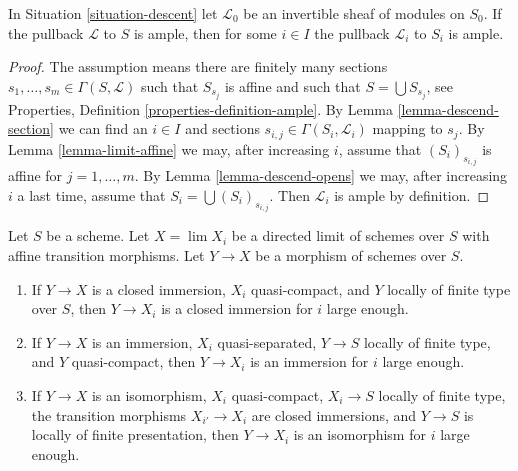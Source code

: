 \begin{lemma}
\label{lemma-limit-ample}
In Situation \ref{situation-descent} let $\mathcal{L}_0$ be an invertible
sheaf of modules on $S_0$. If the pullback $\mathcal{L}$ to $S$ is ample,
then for some $i \in I$ the pullback $\mathcal{L}_i$ to $S_i$ is ample.
\end{lemma}

\begin{proof}
The assumption means there are finitely many sections
$s_1, \ldots, s_m \in \Gamma(S, \mathcal{L})$ such that
$S_{s_j}$ is affine and such that $S = \bigcup S_{s_j}$, see
Properties, Definition \ref{properties-definition-ample}.
By Lemma \ref{lemma-descend-section} we can find an $i \in I$
and sections $s_{i, j} \in \Gamma(S_i, \mathcal{L}_i)$ mapping to $s_j$.
By Lemma \ref{lemma-limit-affine} we may, after increasing $i$, assume
that $(S_i)_{s_{i, j}}$ is affine for $j = 1, \ldots, m$.
By Lemma \ref{lemma-descend-opens} we may, after increasing $i$ a
last time, assume that $S_i = \bigcup (S_i)_{s_{i, j}}$.
Then $\mathcal{L}_i$ is ample by definition.
\end{proof}

\begin{lemma}
\label{lemma-finite-type-eventually-closed}
Let $S$ be a scheme. Let $X = \lim X_i$ be a directed limit of
schemes over $S$ with affine transition morphisms. Let $Y \to X$
be a morphism of schemes over $S$.
\begin{enumerate}
\item If $Y \to X$ is a closed immersion, $X_i$ quasi-compact, and
$Y$ locally of finite type over $S$, then $Y \to X_i$ is a closed
immersion for $i$ large enough.
\item If $Y \to X$ is an immersion, $X_i$ quasi-separated, $Y \to S$ locally
of finite type, and $Y$ quasi-compact, then $Y \to X_i$ is an
immersion for $i$ large enough.
\item If $Y \to X$ is an isomorphism, $X_i$ quasi-compact,
$X_i \to S$ locally of finite type, the transition morphisms
$X_{i'} \to X_i$ are closed immersions, and $Y \to S$ is locally
of finite presentation, then $Y \to X_i$ is an isomorphism for $i$
large enough.
\end{enumerate}
\end{lemma}


